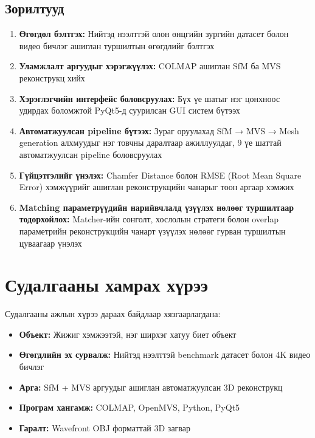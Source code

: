 \subsection{Зорилтууд}

\begin{enumerate}
    \item \textbf{Өгөгдөл бэлтгэх:} Нийтэд нээлттэй олон өнцгийн зургийн датасет болон видео бичлэг ашиглан туршилтын өгөгдлийг бэлтгэх
    \item \textbf{Уламжлалт аргуудыг хэрэгжүүлэх:} COLMAP ашиглан SfM ба MVS реконструкц хийх
    \item \textbf{Хэрэглэгчийн интерфейс боловсруулах:} Бүх үе шатыг нэг цонхноос удирдах боломжтой PyQt5-д суурилсан GUI систем бүтээх
    \item \textbf{Автоматжуулсан pipeline бүтээх:} Зураг оруулахад SfM → MVS → Mesh generation алхмуудыг нэг товчны даралтаар ажиллуулдаг, 9 үе шаттай автоматжуулсан pipeline боловсруулах
    \item \textbf{Гүйцэтгэлийг үнэлэх:} Chamfer Distance болон RMSE (Root Mean Square Error) хэмжүүрийг ашиглан реконструкцийн чанарыг тоон аргаар хэмжих
    \item \textbf{Matching параметрүүдийн нарийвчлалд үзүүлэх нөлөөг туршилтаар тодорхойлох:} Matcher-ийн сонголт, хослолын стратеги болон overlap параметрийн реконструкцийн чанарт үзүүлэх нөлөөг гурван туршилтын цуваагаар үнэлэх
\end{enumerate}

\section{Судалгааны хамрах хүрээ}

Судалгааны ажлын хүрээ дараах байдлаар хязгаарлагдана:

\begin{itemize}
    \item \textbf{Объект:} Жижиг хэмжээтэй, нэг ширхэг хатуу биет объект
    \item \textbf{Өгөгдлийн эх сурвалж:} Нийтэд нээлттэй benchmark датасет болон 4K видео бичлэг
    \item \textbf{Арга:} SfM + MVS аргуудыг ашиглан автоматжуулсан 3D реконструкц
    \item \textbf{Програм хангамж:} COLMAP, OpenMVS, Python, PyQt5
    \item \textbf{Гаралт:} Wavefront OBJ форматтай 3D загвар
\end{itemize}


